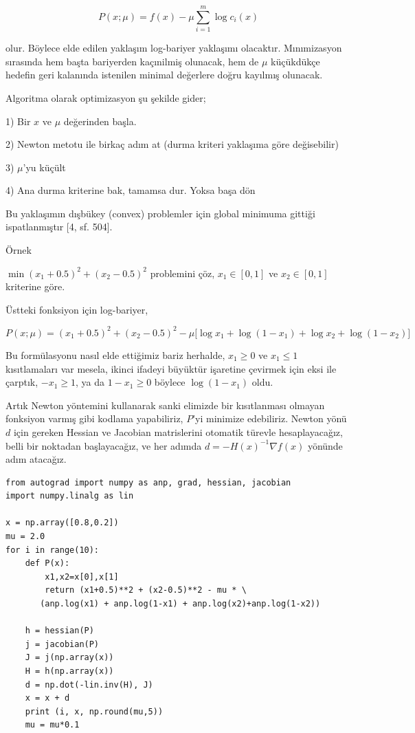 \documentclass[12pt,fleqn]{article}\usepackage{../../common}
\begin{document}
$$
P(x;\mu) = f(x) - \mu \sum_{i=1}^{m} \log c_i(x) 
$$

olur. Böylece elde edilen yaklaşım log-bariyer yaklaşımı
olacaktır. Mınımizasyon sırasında hem başta bariyerden kaçınilmiş olunacak,
hem de $\mu$ küçükdükçe hedefin geri kalanında istenilen minimal değerlere
doğru kayılmış olunacak. 

Algoritma olarak optimizasyon şu şekilde gider;

1) Bir $x$ ve $\mu$ değerinden başla.

2) Newton metotu ile birkaç adım at (durma kriteri yaklaşıma göre değisebilir)

3) $\mu$'yu küçült

4) Ana durma kriterine bak, tamamsa dur. Yoksa başa dön

Bu yaklaşımın dışbükey (convex) problemler için global minimuma
gittiği ispatlanmıştır [4, sf. 504].

Örnek

$\min (x_1 + 0.5)^2 + (x_2 - 0.5)^2$ problemini çöz, $x_1 \in [0,1]$ ve $x_2 \in
[0,1]$ kriterine göre.

Üstteki fonksiyon için log-bariyer,

$$
P(x;\mu) = (x_1 + 0.5)^2 + (x_2-0.5)^2 -
\mu 
\big[
\log x_1 + \log (1-x_1) + \log x_2 + \log (1-x_2)
\big]
$$

Bu formülasyonu nasıl elde ettiğimiz bariz herhalde, $x_1 \ge 0$ ve
$x_1 \le 1$ kısıtlamaları var mesela, ikinci ifadeyi büyüktür
işaretine çevirmek için eksi ile çarptık, $-x_1 \ge 1$, ya da $1-x_1
\ge 0$ böylece $\log(1-x_1)$ oldu.

Artık Newton yöntemini kullanarak sanki elimizde bir kısıtlanması
olmayan fonksiyon varmış gibi kodlama yapabiliriz, $P$'yi minimize
edebiliriz. Newton yönü $d$ için gereken Hessian ve Jacobian
matrislerini otomatik türevle hesaplayacağız, belli bir noktadan
başlayacağız, ve her adımda $d = -H(x)^{-1} \nabla f(x)$ yönünde adım
atacağız.

\begin{verbatim}
from autograd import numpy as anp, grad, hessian, jacobian
import numpy.linalg as lin

x = np.array([0.8,0.2])
mu = 2.0
for i in range(10):
    def P(x):
    	x1,x2=x[0],x[1]
    	return (x1+0.5)**2 + (x2-0.5)**2 - mu * \
	   (anp.log(x1) + anp.log(1-x1) + anp.log(x2)+anp.log(1-x2))

    h = hessian(P)
    j = jacobian(P)
    J = j(np.array(x))
    H = h(np.array(x))
    d = np.dot(-lin.inv(H), J)
    x = x + d
    print (i, x, np.round(mu,5))
    mu = mu*0.1
\end{verbatim}
\end{document}
